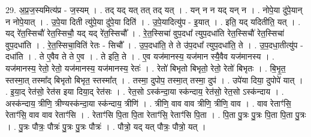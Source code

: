 \documentclass[17pt]{extarticle}
\begin{document}
29. अ॒प्र॒ज॒स्यमित्य॑प्र - ज॒स्यम् । . तद् यद् यत् तत् तद् यत् । . यन् न न यद् यन् न । . नोपे॒या दु॑पे॒यान् न नोपे॒यात् । . उ॒पे॒या दिती त्यु॑पे॒या दु॑पे॒या दिति॑ । . उ॒पे॒यादित्यु॑प - इ॒यात् । . इति॒ यद् यदितीति॒ यत् । . यद् रे॑त॒स्सिचौ॑ रेत॒स्सिचौ॒ यद् यद् रे॑त॒स्सिचौ᳚ । . रे॒त॒स्सिचा॑ वुप॒दधा᳚ त्युप॒दधा॑ति रेत॒स्सिचौ॑ रेत॒स्सिचा॑ वुप॒दधा॑ति । . रे॒त॒स्सिचा॒विति॑ रेतः - सिचौ᳚ । . उ॒प॒दधा॑ति॒ ते ते उ॑प॒दधा᳚ त्युप॒दधा॑ति॒ ते । . उ॒प॒दधा॒तीत्यु॑प - दधा॑ति । . ते ए॒वैव ते ते ए॒व । . ते इति॒ ते । . ए॒व यज॑मानस्य॒ यज॑मान स्यै॒वैव यज॑मानस्य । . यज॑मानस्य॒ रेतो॒ रेतो॒ यज॑मानस्य॒ यज॑मानस्य॒ रेतः॑ । . रेतो॑ बिभृतो बिभृतो॒ रेतो॒ रेतो॑ बिभृतः । . बि॒भृ॒त॒ स्तस्मा॒त् तस्मा᳚द् बिभृतो बिभृत॒ स्तस्मा᳚त् । . तस्मा॒ दुपोप॒ तस्मा॒त् तस्मा॒ दुप॑ । . उपे॑या दिया॒ दुपोपे॑ यात् । . इ॒या॒द् रेत॑सो॒ रेत॑स इया दिया॒द् रेत॑सः । . रेत॒सो ऽस्क॑न्दा॒या स्क॑न्दाय॒ रेत॑सो॒ रेत॒सो ऽस्क॑न्दाय । . अस्क॑न्दाय॒ त्रीणि॒ त्रीण्यस्क॑न्दा॒या स्क॑न्दाय॒ त्रीणि॑ । . त्रीणि॒ वाव वाव त्रीणि॒ त्रीणि॒ वाव । . वाव रेताꣳ॑सि॒ रेताꣳ॑सि॒ वाव वाव रेताꣳ॑सि । . रेताꣳ॑सि पि॒ता पि॒ता रेताꣳ॑सि॒ रेताꣳ॑सि पि॒ता । . पि॒ता पु॒त्रः पु॒त्रः पि॒ता पि॒ता पु॒त्रः । . पु॒त्रः पौत्रः॒ पौत्रः॑ पु॒त्रः पु॒त्रः पौत्रः॑ । . पौत्रो॒ यद् यत् पौत्रः॒ पौत्रो॒ यत् । \newline
\end{document}
